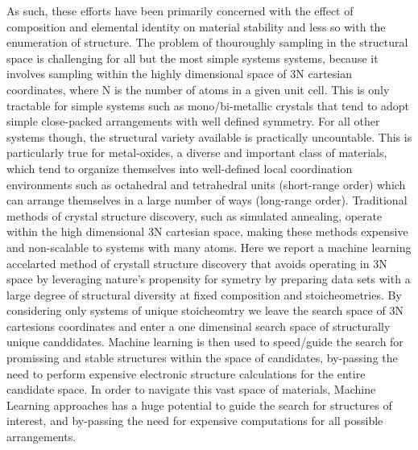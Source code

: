 %
As such, these efforts have been primarily concerned with the effect of composition and elemental identity on material stability and less so with the enumeration of structure.
%
The problem of thouroughly sampling in the structural space is challenging for all but the most simple systems systems,
because it involves sampling within the highly dimensional space of 3N cartesian coordinates, where N is the number of atoms in a given unit cell.
This is only tractable for simple systems such as mono/bi-metallic crystals that tend to adopt simple close-packed arrangements with well defined symmetry.
%
For all other systems though, the structural variety available is practically uncountable.
This is particularly true for metal-oxides, a diverse and important class of materials,
which tend to organize themselves into well-defined local coordination environments such as octahedral and tetrahedral units (short-range order) which can arrange themselves in a large number of ways (long-range order).
%
Traditional methods of crystal structure discovery, such as simulated annealing, operate within the high dimensional 3N cartesian space, making these methods expensive and non-scalable to systems with many atoms.
%
Here we report a machine learning accelarted method of crystall structure discovery that avoids operating in 3N space by leveraging nature's propensity for symetry by preparing data sets with a large degree of structural diversity at fixed composition and stoicheometries.
%
By considering only systems of unique stoicheomtry we leave the search space of 3N cartesions coordinates and enter a one dimensinal search space of structurally unique canddidates.
%
Machine learning is then used to speed/guide the search for promissing and stable structures within the space of candidates, by-passing the need to perform expensive electronic structure calculations for the entire candidate space.
%
In order to navigate this vast space of materials, Machine Learning approaches has a huge potential to guide the search for structures of interest, and by-passing the need for expensive computations for all possible arrangements.
%




